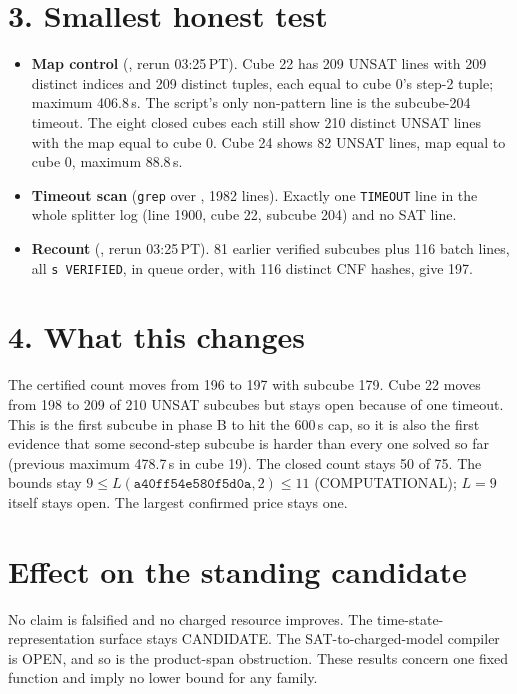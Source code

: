\documentclass[11pt]{article}
\begin{document}
\section*{3. Smallest honest test}
\begin{itemize}
\item \textbf{Map control} (, rerun 03:25\,PT). Cube 22 has 209 UNSAT lines with 209 distinct indices and 209 distinct tuples, each equal to cube 0's step-2 tuple; maximum 406.8\,s. The script's only non-pattern line is the subcube-204 timeout. The eight closed cubes each still show 210 distinct UNSAT lines with the map equal to cube 0. Cube 24 shows 82 UNSAT lines, map equal to cube 0, maximum 88.8\,s.
\item \textbf{Timeout scan} (\texttt{grep} over , 1982 lines). Exactly one \texttt{TIMEOUT} line in the whole splitter log (line 1900, cube 22, subcube 204) and no SAT line.
\item \textbf{Recount} (, rerun 03:25\,PT). 81 earlier verified subcubes plus 116 batch lines, all \texttt{s VERIFIED}, in queue order, with 116 distinct CNF hashes, give 197.
\end{itemize}

\section*{4. What this changes}
The certified count moves from 196 to 197 with subcube 179. Cube 22 moves from 198 to 209 of 210 UNSAT subcubes but stays open because of one timeout. This is the first subcube in phase B to hit the 600\,s cap, so it is also the first evidence that some second-step subcube is harder than every one solved so far (previous maximum 478.7\,s in cube 19). The closed count stays 50 of 75. The bounds stay $9\le L(\texttt{a40ff54e580f5d0a},2)\le 11$ (COMPUTATIONAL); $L=9$ itself stays open. The largest confirmed price stays one.

\section*{Effect on the standing candidate}
No claim is falsified and no charged resource improves. The time-state-representation surface stays CANDIDATE. The SAT-to-charged-model compiler is OPEN, and so is the product-span obstruction. These results concern one fixed function and imply no lower bound for any family.
\end{document}
